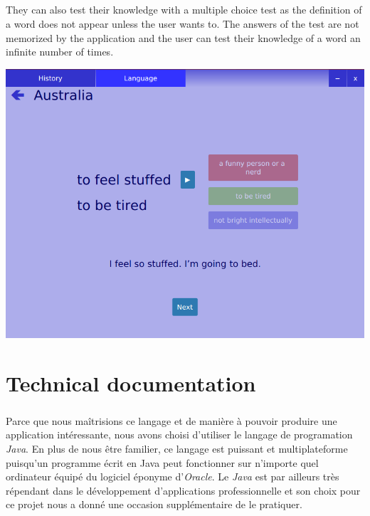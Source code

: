 \documentclass[11pt, a4paper]{report}
\begin{document}
\paragraph{}They can also test their knowledge with a multiple choice test as the definition of a word does not appear unless the user wants to. The answers of the test are not memorized by the application and the user can test their knowledge of a word an infinite number of times.

\vspace{0.08cm}
\centerline{\includegraphics[scale=0.5]{images/AustraliaWrongAnswer.png}}



\chapter*{Technical documentation}
\paragraph{}Parce que nous maîtrisions ce langage et de manière à pouvoir produire une application intéressante, nous avons choisi d'utiliser le langage de programation \textit{Java}. En plus de nous être familier, ce langage est puissant et multiplateforme puisqu'un programme écrit en Java peut fonctionner sur n'importe quel ordinateur équipé du logiciel éponyme d'\textit{Oracle}. Le \textit{Java} est par ailleurs très répendant dans le développement d'applications professionnelle et son choix pour ce projet nous a donné une occasion supplémentaire de le pratiquer.
\end{document}
